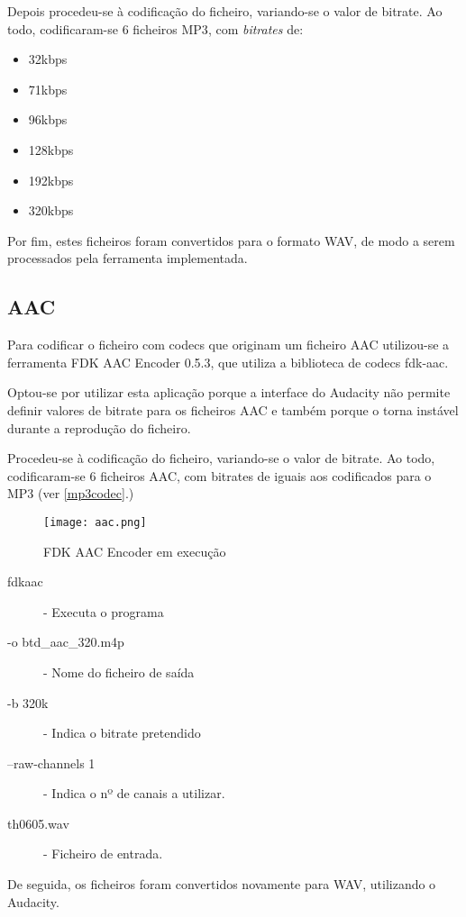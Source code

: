 \documentclass[a4paper]{report}
\begin{document}
Depois procedeu-se à codificação do ficheiro, variando-se o valor de \gls{bitrate}. Ao todo, codificaram-se 6 ficheiros \gls{MP3}, com \textit{bitrates} de:
\begin{itemize}
\item 32kbps
\item 71kbps
\item 96kbps
\item 128kbps
\item 192kbps
\item 320kbps
\end{itemize}

Por fim, estes ficheiros foram convertidos para o formato \gls{WAV}, de modo a serem processados pela ferramenta implementada.

\subsection{AAC}
\label{aac}
Para codificar o ficheiro com codecs que originam um ficheiro \gls{AAC} utilizou-se a ferramenta FDK AAC Encoder 0.5.3, que utiliza a biblioteca de codecs fdk-aac.

Optou-se por utilizar esta aplicação porque a interface do Audacity não permite definir valores de \gls{bitrate} para os ficheiros \gls{AAC} e também porque o torna instável durante a reprodução do ficheiro.

Procedeu-se à codificação do ficheiro, variando-se o valor de \gls{bitrate}. Ao todo, codificaram-se 6 ficheiros \gls{AAC}, com bitrates de iguais aos codificados para o \gls{MP3} (ver \autoref{mp3codec}.)

\begin{figure}[ht]
 \texttt{[image: aac.png]}
 \caption{FDK AAC Encoder em execução}
 \label{fdkaac}
\end{figure}

\begin{description}
\item[fdkaac] - Executa o programa
\item[-o btd\_aac\_320.m4p] - Nome do ficheiro de saída
\item[-b 320k] - Indica o \gls{bitrate} pretendido
\item[--raw-channels 1] - Indica o nº de canais a utilizar.
\item[th06\textunderscore05.wav] - Ficheiro de entrada.
\end{description}
De seguida, os ficheiros foram convertidos novamente para \gls{WAV}, utilizando o Audacity.
\end{document}
